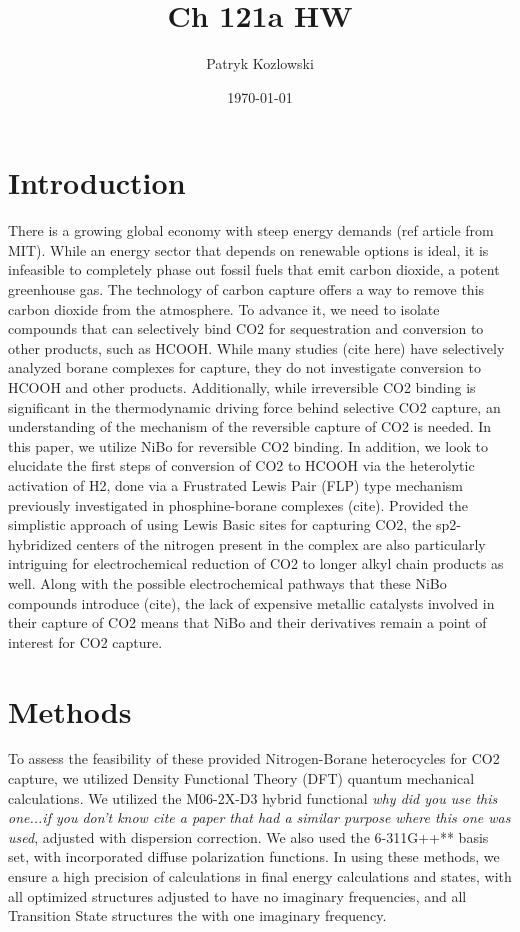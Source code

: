 \documentclass[12pt]{article}
\title{Ch 121a HW}
\author{Patryk Kozlowski}
\date{\today}
\begin{document}
\maketitle
\section{Introduction}
There is a growing global economy with steep energy demands (ref article from MIT). While an energy sector that depends on renewable options is ideal, it is infeasible to completely phase out fossil fuels that emit carbon dioxide, a potent greenhouse gas. The technology of carbon capture offers a way to remove this carbon dioxide from the atmosphere. To advance it, we need to isolate compounds that can selectively bind CO2 for sequestration and conversion to other products, such as HCOOH. While many studies (cite here) have selectively analyzed borane complexes for capture, they do not investigate conversion to HCOOH and other products. Additionally, while irreversible CO2 binding is significant in the thermodynamic driving force behind selective CO2 capture, an understanding of the mechanism of the reversible capture of CO2 is needed. In this paper, we utilize NiBo for reversible CO2 binding. In addition, we look to elucidate the first steps of conversion of CO2 to HCOOH via the heterolytic activation of H2, done via a Frustrated Lewis Pair (FLP) type mechanism previously investigated in phosphine-borane complexes (cite). Provided the simplistic approach of using Lewis Basic sites for capturing CO2, the sp2-hybridized centers of the nitrogen present in the complex are also particularly intriguing for electrochemical reduction of CO2 to longer alkyl chain products as well. Along with the possible electrochemical pathways that these NiBo compounds introduce (cite), the lack of expensive metallic catalysts involved in their capture of CO2 means that NiBo and their derivatives remain a point of interest for CO2 capture.  

\section{Methods}

To assess the feasibility of these provided Nitrogen-Borane heterocycles for CO2 capture, we utilized Density Functional Theory (DFT) quantum mechanical calculations. We utilized the M06-2X-D3 hybrid functional \emph{why did you use this one...if you don't know cite a paper that had a similar purpose where this one was used}, adjusted with dispersion correction. We also used the 6-311G++** basis set, with incorporated diffuse polarization functions. In using these methods, we ensure a high precision of calculations in final energy calculations and states, with all optimized structures adjusted to have no imaginary frequencies, and all Transition State structures the with one imaginary frequency. 
\end{document}
